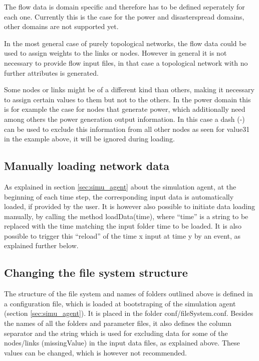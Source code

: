 \documentclass[11pt,fleqn]{book} %
\newcommand{\mainagent}{simulation agent}
\newcommand{\domain}[1][]{domain#1}
\begin{document}
The flow data is \domain{} specific and therefore has to be defined seperately for each one. Currently this is the case for the power and disaster\textunderscore spread \domain{s}, other \domain{s} are not supported yet.

In the most general case of purely topological networks, the flow data could be used to assign weights to the links or nodes. However in general it is not necessary to provide flow input files, in that case a topological network with no further attributes is generated.

Some nodes or links might be of a different kind than others, making it necessary to assign certain values to them but not to the others. In the power \domain{} this is for example the case for nodes that generate power, which additionally need among others the power generation output information. In this case a dash (-) can be used to exclude this information from all other nodes as seen for value31 in the example above, it will be ignored during loading. 

\subsection{Manually loading network data}
As explained in section \ref{sec:simu_agent} about the \mainagent, at the beginning of each time step, the corresponding input data is automatically loaded, if provided by the user. It is however also possible to initiate data loading manually, by calling the method loadData(time), where “time” is a string to be replaced with the time matching the input folder time to be loaded. It is also possible to trigger this “reload” of the time x input at time y by an event, as explained further below.

\subsection{Changing the file system structure}
The structure of the file system and names of folders outlined above is defined in a configuration file, which is loaded at bootstraping of the \mainagent{} (section \ref{sec:simu_agent}). It is placed in the folder conf/fileSystem.conf. Besides the names of all the folders and parameter files, it also defines the column separator and the string which is used for excluding data for some of the nodes/links (missingValue) in the input data files, as explained above. These values can be changed, which is however not recommended.
\end{document}
